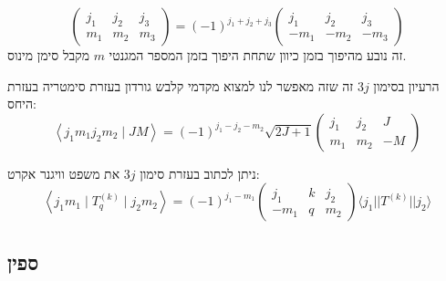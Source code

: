 \documentclass{tstextbook}
\begin{document}
\begin{proposition}
$$\begin{pmatrix}j_{1} & j_{2} & j_{3} \\m_{1} & m_{2} & m_{3}\end{pmatrix}= (-1)^{j_{1}+j_{2}+j_{3}}\begin{pmatrix}j_{1} & j_{2} & j_{3} \\-m_{1} & -m_{2} & -m_{3}
\end{pmatrix}$$
זה נובע מהיפוך בזמן כיוון שתחת היפוך בזמן המספר המגנטי \(m\) מקבל סימן מינוס.

\end{proposition}
הרעיון בסימון \(3j\) זה שזה מאפשר לנו למצוא מקדמי קלבש גורדון בעזרת סימטריה בעזרת היחס:
$$\left\langle  j_{1}m_{1}j_{2}m_{2} \mid JM \right\rangle=(-1)^{j_{1}-j_{2}-m_{2}}\sqrt{ 2J+1 }\begin{pmatrix}j_{1} & j_{2} & J \\m_{1} & m_{2} & -M
\end{pmatrix} $$

\begin{remark}
ניתן לכתוב בעזרת סימון \(3j\) את משפט וויגנר אקרט:
$$\left\langle  j_{1}m_{1}\mid T_{q}^{(k)}\mid j_{2}m_{2}  \right\rangle =(-1)^{j_{1}-m_{1}}\begin{pmatrix}j_{1} & k & j_{2} \\-m_{1} & q & m_{2} 
\end{pmatrix}\langle j_{1}|| T^{(k)}||j_{2} \rangle $$

\end{remark}
\subsection{ספין}
\end{document}
